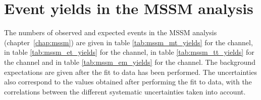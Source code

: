 \chapter{\texorpdfstring{Event yields in the MSSM \AHtotautau analysis}{Event yields in the MSSM A/H to tautau analysis}}
\label{appendix:yields_mssm}
The numbers of observed and expected events in the MSSM \AHtotautau analysis \mbox{(chapter \ref{chap:mssm})}
are given in table \ref{tab:mssm_mt_yields} for the \mutau channel, in table \ref{tab:mssm_et_yields} for the 
\etau channel, in table \ref{tab:mssm_tt_yields} for the \tautau channel 
and in table \ref{tab:mssm_em_yields} for the \emu channel. The background
expectations are given after the fit to data has been performed. The uncertainties also correspond
to the values obtained after performing the fit to data, with the correlations between the different
systematic uncertainties taken into account. 






